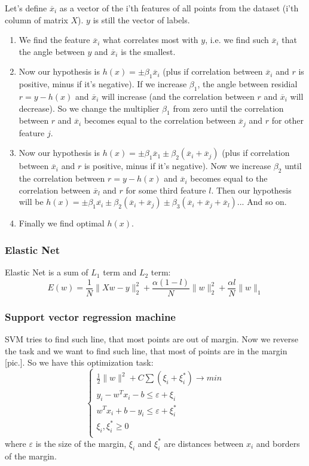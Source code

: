Let's define $\overline{x}_i$ as a vector of the i'th features of all points from the dataset (i'th column of matrix $X$). $y$ is still the vector of labels.
\begin{enumerate}
	\item We find the feature $\overline{x}_i$ what correlates most with $y$, i.e. we find such $\overline{x}_i$ that the angle between $y$ and $\overline{x}_i$ is the smallest.
	\item Now our hypothesis is $h(x)=\pm\beta_1\overline{x}_i$ (plus if correlation between $\overline{x}_i$ and $r$ is positive, minus if it's negative). If we increase $\beta_1$, the angle between residial $r=y-h(x)$ and $\overline{x}_i$ will increase (and  the correlation between $r$ and $\overline{x}_i$ will decrease). So we change the multiplier $\beta_1$ from zero until the correlation between $r$ and $\overline{x}_i$ becomes equal to the correlation between $\overline{x}_j$ and $r$ for other feature $j$.
	\item Now our hypothesis is $h(x)=\pm\beta_1\overline{x}_1\pm\beta_2(\overline{x}_i+\overline{x}_j)$ (plus if correlation between $\overline{x}_i$ and $r$ is positive, minus if it's negative). Now we increase $\beta_2$ until the correlation between $r=y-h(x)$ and $\overline{x}_i$ becomes equal to the correlation between $\overline{x}_l$ and $r$ for some third feature $l$. Then our hypothesis will be $h(x)=\pm\beta_1\overline{x_i}\pm\beta_2(\overline{x}_i+\overline{x}_j)\pm\beta_3(\overline{x}_i+\overline{x}_j+\overline{x}_l)$... And so on.
	\item Finally we find optimal $h(x)$.
\end{enumerate}

\subsubsection*{Elastic Net}

Elastic Net is a sum of $L_1$ term and $L_2$ term:
$$E(w)=\frac{1}{N}\|Xw-y\|_2^2+\frac{\alpha(1-l)}{N}\|w\|_2^2+\frac{\alpha l}{N}\|w\|_1$$

\subsubsection*{Support vector regression machine}

SVM tries to find such line, that most points are out of margin. Now we reverse the task and we want to find such line, that most of points are in the margin [pic.]. So we have this optimization task:
$$\begin{cases}
	\frac{1}{2}\|w\|^2+C\sum(\xi_i+\xi_i^*)\to min \\
	y_i-w^Tx_i-b\le\varepsilon+\xi_i \\
	w^Tx_i+b-y_i\le\varepsilon+\xi_i^* \\
	\xi_i,\xi_i^* \ge 0 \\
\end{cases}$$
where $\varepsilon$ is the size of the margin, $\xi_i$ and $\xi_i^*$ are distances between $x_i$ and borders of the margin.

